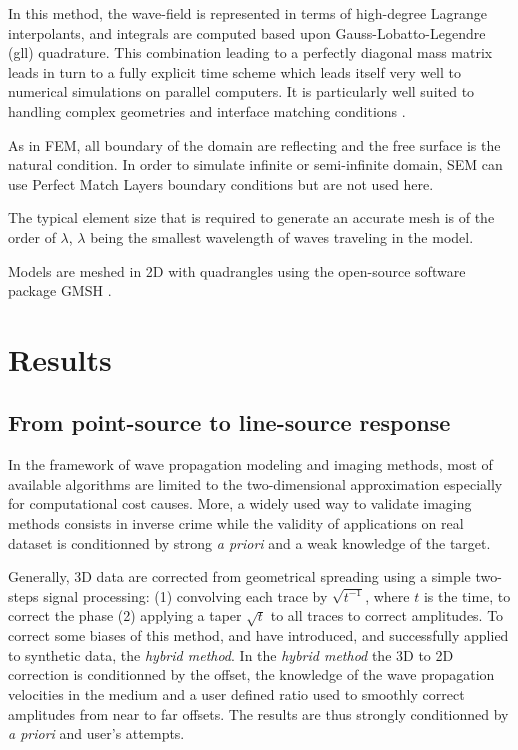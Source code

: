 \documentclass[manuscript,revised]{geophysics}
\newcommand{\twod}{two-dimensional }
\begin{document}
\noindent In this method, the wave-field is represented in terms of high-degree Lagrange interpolants, and integrals are computed based upon Gauss-Lobatto-Legendre (gll) quadrature. This combination leading to a perfectly diagonal mass matrix leads in turn to a fully explicit time scheme which leads itself very well to numerical simulations on parallel computers. It is particularly well suited to handling complex geometries and interface matching conditions \citep{Cristini_SEM_2012}. 

\noindent As in FEM, all boundary of the domain are reflecting and the free surface is the natural condition.  In order to simulate infinite or semi-infinite domain, SEM can use Perfect Match Layers boundary conditions \citep{Berenger_PML_1994,Festa_PML_2005} but are not used here.
 
\noindent The typical element size that is required to generate an accurate mesh is of the order of $\lambda$, $\lambda$ being the smallest wavelength of waves traveling in the model.

\noindent Models are meshed in 2D with quadrangles using the open-source software package GMSH \citep{Geuzaine_MSH_2009}. 

\section{Results}

\subsection{From point-source to line-source response}

\noindent In the framework of wave propagation modeling and imaging methods, most of available algorithms are limited to the \twod approximation especially for computational cost causes. More, a widely used way to validate imaging methods consists in inverse crime while the validity of applications on real dataset is conditionned by strong \textit{a priori} and a weak knowledge of the target.

\noindent Generally, 3D data are corrected from geometrical spreading using a simple two-steps signal processing: (1) convolving each trace by $\sqrt{t^{-1}}$, where $t$ is the time, to correct the phase (2) applying a taper $\sqrt{t}$ to all traces to correct amplitudes. To correct some biases of this method, \citet{Forbriger_LSS_2014} and \citet{Schafer_LSS_2014} have introduced, and successfully applied to synthetic data, the \textit{hybrid method}. In the \textit{hybrid method} the 3D to 2D correction is conditionned by the offset, the knowledge of the wave propagation velocities in the medium and a user defined ratio used to smoothly correct amplitudes from near to far offsets. The results are thus strongly conditionned by \textit{a priori} and user's attempts.   
\end{document}
